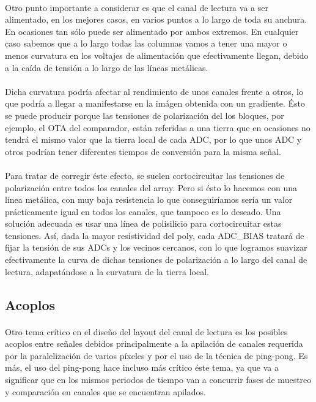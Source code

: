 \paragraph{}
Otro punto importante a considerar es que el canal de lectura va a ser alimentado,
en los mejores casos, en varios puntos a lo largo de toda su anchura. En ocasiones
tan sólo puede ser alimentado por ambos extremos. En cualquier caso sabemos que
a lo largo todas las columnas vamos a tener una mayor o menos curvatura en los voltajes
de alimentación que efectivamente llegan, debido a la caída de tensión a lo largo
de las líneas metálicas.

\paragraph{}
Dicha curvatura podría afectar al rendimiento de unos canales frente a otros, lo
que podría a llegar a manifestarse en la imágen obtenida con un gradiente.
Ésto se puede producir porque las tensiones de polarización del los bloques, por
ejemplo, el OTA del comparador, están referidas a una tierra que en ocasiones no
tendrá el mismo valor que la tierra local de cada ADC, por lo que unos ADC y otros
podrían tener diferentes tiempos de conversión para la misma señal.

\paragraph{}
Para tratar de corregir éste efecto, se suelen cortocircuitar las tensiones de polarización
entre todos los canales del array. Pero si ésto lo hacemos con una línea metálica,
con muy baja resistencia lo que conseguiríamos sería un valor prácticamente igual
en todos los canales, que tampoco es lo deseado. Una solución adecuada es usar
una línea de polisilicio para cortocircuitar estas tensiones. Así, dada la mayor
resistividad del poly, cada ADC\_BIAS tratará de fijar la tensión de sus ADCs y los
vecinos cercanos, con lo que logramos suavizar efectivamente la curva de dichas
tensiones de polarización a lo largo del canal de lectura, adapatándose a la
curvatura de la tierra local.

\subsection{Acoplos}

\paragraph{}
Otro tema crítico en el diseño del layout del canal de lectura es los posibles acoplos
entre señales debidos principalmente a la apilación de canales requerida por la
paralelización de varios píxeles y por el uso de la técnica de ping-pong. Es más,
el uso del ping-pong hace incluso más crítico éste tema, ya que va a significar
que en los mismos periodos de tiempo van a concurrir fases de muestreo y comparación
en canales que se encuentran apilados.

